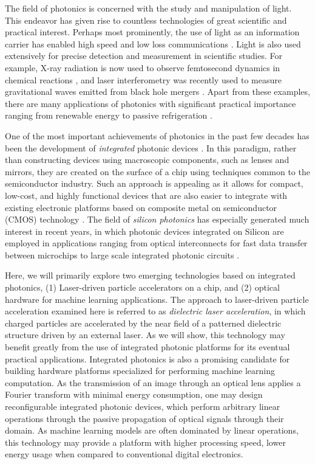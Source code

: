 
The field of photonics is concerned with the study and manipulation of light.
This endeavor has given rise to countless technologies of great scientific and practical interest.
Perhaps most prominently, the use of light as an information carrier has enabled high speed and low loss communications \cite{agrawal_fiber-optic_2012}.
Light is also used extensively for precise detection and measurement in scientific studies.  
For example, X-ray radiation is now used to observe femtosecond dynamics in chemical reactions \cite{kern_structures_2018}, and laser interferometry was recently used to measure gravitational waves emitted from black hole mergers \cite{ligo_scientific_collaboration_and_virgo_collaboration_observation_2016}.
Apart from these examples, there are many applications of photonics with significant practical importance ranging from renewable energy \cite{carlson_amorphous_1976,yu_fundamental_2010} to passive refrigeration \cite{raman_passive_2014,hsu_radiative_2016}.

One of the most important achievements of photonics in the past few decades has been the development of \textit{integrated} photonic devices \cite{pollock_integrated_2010}.
In this paradigm, rather than constructing devices using macroscopic components, such as lenses and mirrors, they are created on the surface of a chip using techniques common to the semiconductor industry.
Such an approach is appealing as it allows for compact, low-cost, and highly functional devices that are also easier to integrate with existing electronic platforms based on composite metal on semiconductor (CMOS) technology \cite{weste_principles_1985}.
The field of \textit{silicon photonics} has especially generated much interest in recent years, in which photonic devices integrated on Silicon are employed in applications ranging from optical interconnects for fast data transfer between microchips to large scale integrated photonic circuits \cite{jalali_silicon_2006}.

Here, we will primarily explore two emerging technologies based on integrated photonics, (1) Laser-driven particle accelerators on a chip, and (2) optical hardware for machine learning applications.
The approach to laser-driven particle acceleration examined here is referred to as \textit{dielectric laser acceleration}, in which charged particles are accelerated by the near field of a patterned dielectric structure driven by an external laser.
As we will show, this technology may benefit greatly from the use of integrated photonic platforms for its eventual practical applications.
Integrated photonics is also a promising candidate for building hardware platforms specialized for performing machine learning computation.
As the transmission of an image through an optical lens applies a Fourier transform with minimal energy consumption, one may design reconfigurable integrated photonic devices, which perform arbitrary linear operations through the passive propagation of optical signals through their domain.
As machine learning models are often dominated by linear operations, this technology may provide a platform with higher processing speed, lower energy usage when compared to conventional digital electronics.


